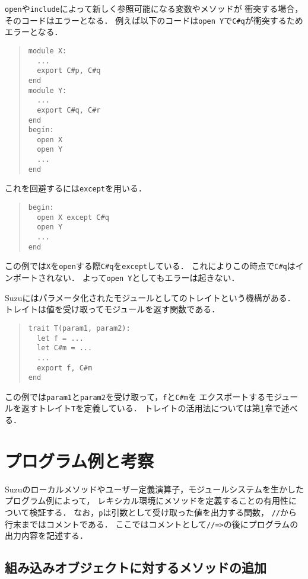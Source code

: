 \documentclass[a4paper,11pt,dvipdfmx]{jreport}
\begin{document}
\verb|open|や\verb|include|によって新しく参照可能になる変数やメソッドが
衝突する場合，そのコードはエラーとなる．
例えば以下のコードは\verb|open Y|で\verb|C#q|が衝突するためエラーとなる．
\begin{quote}
\begin{verbatim}
module X:
  ... 
  export C#p, C#q
end
module Y:
  ...
  export C#q, C#r
end
begin:
  open X
  open Y
  ...
end
\end{verbatim}
\end{quote}
これを回避するには\verb|except|を用いる．
\begin{quote}
\begin{verbatim}
begin:
  open X except C#q
  open Y
  ...
end
\end{verbatim}
\end{quote}
この例では\verb|X|を\verb|open|する際\verb|C#q|を\verb|except|している．
これによりこの時点で\verb|C#q|はインポートされない．
よって\verb|open Y|としてもエラーは起きない．

Suzuにはパラメータ化されたモジュールとしてのトレイトという機構がある．
トレイトは値を受け取ってモジュールを返す関数である．
\begin{quote}
\begin{verbatim}
trait T(param1, param2):
  let f = ...
  let C#m = ...
  ...
  export f, C#m
end
\end{verbatim}
\end{quote}
この例では\verb|param1|と\verb|param2|を受け取って，\verb|f|と\verb|C#m|を
エクスポートするモジュールを返すトレイト\verb|T|を定義している．
トレイトの活用法については第\ref{chapter:discussion}章で述べる．


\chapter{プログラム例と考察}
\label{chapter:discussion}

Suzuのローカルメソッドやユーザー定義演算子，モジュールシステムを生かした
プログラム例によって，
レキシカル環境にメソッドを定義することの有用性について検証する．
なお，\verb|p|は引数として受け取った値を出力する関数，
\verb|//|から行末まではコメントである．
ここではコメントとして\verb|//=>|の後にプログラムの出力内容を記述する．

\section{組み込みオブジェクトに対するメソッドの追加}
\end{document}
